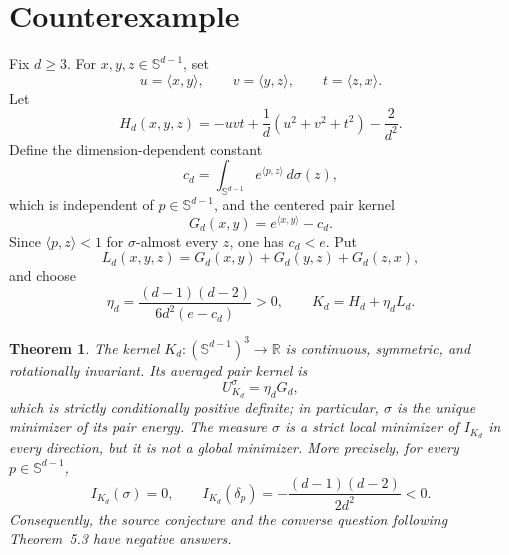 \documentclass[11pt]{article}
\newtheorem{theorem}{Theorem}
\newcommand{\Sph}{\mathbb S^{d-1}}
\newcommand{\R}{\mathbb R}
\begin{document}
\section{Counterexample}

Fix $d\ge3$.  For $x,y,z\in\Sph$, set
\[
 u=\langle x,y\rangle,\qquad
 v=\langle y,z\rangle,\qquad
 t=\langle z,x\rangle.
\]
Let
\begin{equation}\label{eq:H}
 H_d(x,y,z)=-uvt+\frac1d(u^2+v^2+t^2)-\frac{2}{d^2}.
\end{equation}
Define the dimension-dependent constant
\[
 c_d=\int_{\Sph}e^{\langle p,z\rangle}\,d\sigma(z),
\]
which is independent of $p\in\Sph$, and the centered pair kernel
\begin{equation}\label{eq:G}
 G_d(x,y)=e^{\langle x,y\rangle}-c_d.
\end{equation}
Since $\langle p,z\rangle<1$ for $\sigma$-almost every $z$, one has $c_d<e$.
Put
\[
 L_d(x,y,z)=G_d(x,y)+G_d(y,z)+G_d(z,x),
\]
and choose
\begin{equation}\label{eq:eta}
 \eta_d=\frac{(d-1)(d-2)}{6d^2(e-c_d)}>0,
 \qquad K_d=H_d+\eta_dL_d.
\end{equation}

\begin{theorem}\label{thm:main}
The kernel $K_d:(\Sph)^3\to\R$ is continuous, symmetric, and rotationally
invariant.  Its averaged pair kernel is
\[
 U_{K_d}^\sigma=\eta_dG_d,
\]
which is strictly conditionally positive definite; in particular, $\sigma$
is the unique minimizer of its pair energy.  The measure $\sigma$ is a strict
local minimizer of $I_{K_d}$ in every direction, but it is not a global
minimizer.  More precisely, for every $p\in\Sph$,
\[
 I_{K_d}(\sigma)=0,
 \qquad
 I_{K_d}(\delta_p)=-\frac{(d-1)(d-2)}{2d^2}<0.
\]
Consequently, the source conjecture and the converse question following
Theorem~5.3 have negative answers.
\end{theorem}
\end{document}

